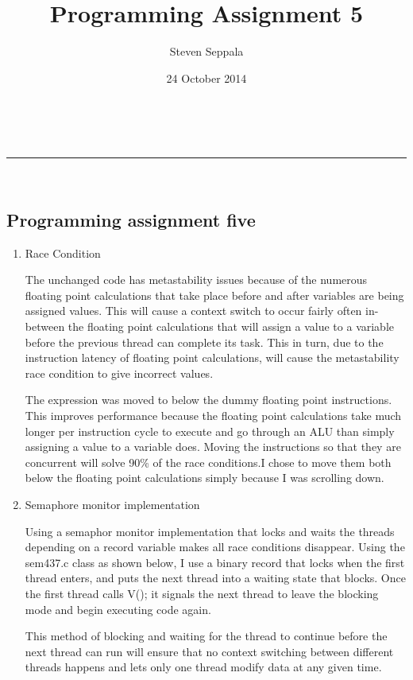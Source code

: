 \documentclass[a4paper,11pt]{article}
\makeatletter
\newcommand{\linia}{\rule{\linewidth}{0.5pt}}
\theoremstyle{mytheor}
\renewcommand{\maketitle}{
\begin{center}
\vspace{2ex}
{\huge \textsc{\@title}}
\vspace{1ex}
\\
\linia\\
\@author \hfill \@date
\vspace{4ex}
\end{center}
}
\makeatother
\begin{document}
\title{Programming Assignment \textnumero{} 5}

\author{Steven Seppala}

\date{24 October 2014}

\maketitle

\begin{center} \section*{Programming assignment five} \end{center}

\begin{enumerate}
\item Race Condition \par
    The unchanged code has metastability issues because of the numerous floating point calculations that take place before and after variables are being assigned values. This will cause a context switch to occur fairly often in-between the floating point calculations that will assign a value to a variable before the previous thread can complete its task. This in turn, due to the instruction latency of floating point calculations, will cause the metastability race condition to give incorrect values.\par
    
    \par The expression was moved to below the dummy floating point instructions. This improves performance because the floating point calculations take much longer per instruction cycle to execute and go through an ALU than simply assigning a value to a variable does. Moving the instructions so that they are concurrent will solve 90\% of the race conditions.I chose to move them both below the floating point calculations simply because I was scrolling down.
    \pagebreak
\item Semaphore monitor implementation \par

Using a semaphor monitor implementation that locks and waits the threads depending on a record variable makes all race conditions disappear. Using the sem437.c class as shown below, I use a binary record that locks when the first thread enters, and puts the next thread into a waiting state that blocks. Once the first thread calls V(); it signals the next thread to leave the blocking mode and begin executing code again.

This method of blocking and waiting for the thread to continue before the next thread can run will ensure that no context switching between different threads happens and lets only one thread modify data at any given time.


\end{enumerate}
\end{document}
